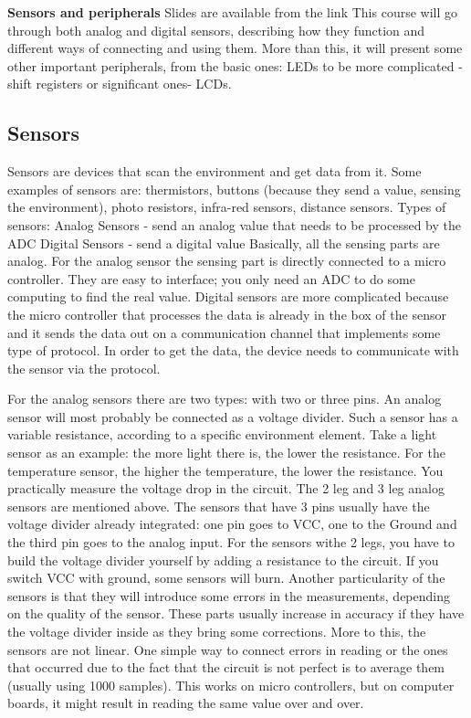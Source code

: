 \textbf{Sensors and peripherals}
Slides are available from the link  
This course will go through both analog and digital sensors, describing how they function and different ways of connecting and using them. More than this, it will present some other important peripherals, from the basic ones: LEDs to be more complicated - shift registers or significant ones- LCDs.  

\subsection{Sensors}
Sensors are devices that scan the environment and get data from it. Some examples of sensors are: thermistors, buttons (because they send a value, sensing the environment), photo resistors, infra-red sensors, distance sensors.  
Types of sensors:  
Analog Sensors - send an analog value that needs to be processed by the ADC 
Digital Sensors - send a digital value 
Basically, all the sensing parts are analog.  
For the analog sensor the sensing part is directly connected to a micro controller. They are easy to interface; you only need an ADC to do some computing to find the real value.  
Digital sensors are more complicated because the micro controller that processes the data is already in the box of the sensor and it sends the data out on a communication channel that implements some type of protocol. In order to get the data, the device needs to communicate with the sensor via the protocol.  

For the analog sensors there are two types: with two or three pins. 
 An analog sensor will most probably be connected as a voltage divider. Such a sensor has a variable resistance, according to a specific environment element. Take a light sensor as an example: the more light there is, the lower the resistance. For the temperature sensor, the higher the temperature, the lower the resistance. You practically measure the voltage drop in the circuit. The 2 leg and 3 leg analog sensors are mentioned above. The sensors that have 3 pins usually have the voltage divider already integrated: one pin goes to VCC, one to the Ground and the third pin goes to the analog input. For the sensors withe 2 legs, you have to build the voltage divider yourself by adding a resistance to the circuit.
 If you switch VCC with ground, some sensors will burn.  
Another particularity of the sensors is that they will introduce some errors in the measurements, depending on the quality of the sensor. These parts usually increase in accuracy if they have the voltage divider inside as they bring some corrections. More to this, the sensors are not linear.  
One simple way to connect errors in reading or the ones that occurred due to the fact that the circuit is not perfect is to average them (usually using 1000 samples). This works on micro controllers, but on computer boards, it might result in reading the same value over and over.  

